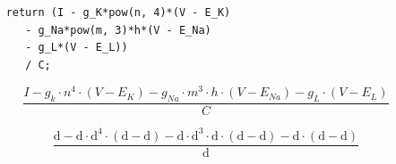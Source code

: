 \documentclass{beamer}
\begin{document}
%    

{
  \begin{frame}[plain]
  \end{frame}
}

\begin{frame}[fragile]
  \begin{verbatim} 
    return (I - g_K*pow(n, 4)*(V - E_K)
       - g_Na*pow(m, 3)*h*(V - E_Na)
       - g_L*(V - E_L))
       / C;
  \end{verbatim}
\end{frame}

\begin{frame}[fragile]
  \begin{equation*}
    \frac{I - g_k \cdot n^4 \cdot \left(V - E_K\right) - g_{Na} \cdot m^3 \cdot h \cdot (V - E_{Na}) - g_L \cdot
      \left(V - E_L\right)}
         {C}
  \end{equation*}
\end{frame}

\begin{frame}[fragile]
  \begin{equation*}
    \frac{\text{d} - \text{d} \cdot \text{d}^4 \cdot \left(\text{d} - \text{d}\right) - \text{d} \cdot \text{d}^3 \cdot \text{d} \cdot (\text{d} - \text{d}) - \text{d} \cdot \left(\text{d} - \text{d}\right)}
         {\text{d}}
  \end{equation*}
\end{frame}
\end{document}
